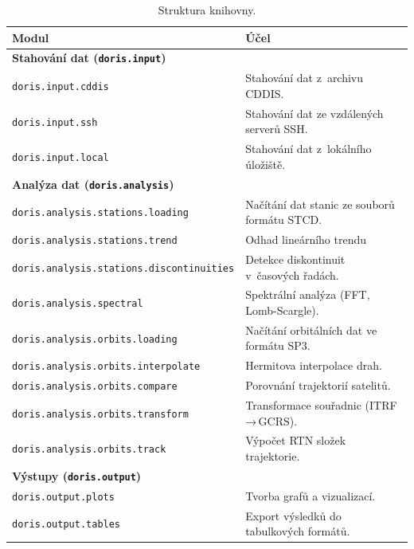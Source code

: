 \begin{table}[H]
\centering
\footnotesize
\setlength{\tabcolsep}{4pt}
\caption{Struktura knihovny.}
\label{tab:doris-structure}

\begin{tabular}{p{} p{}}
\hline
\textbf{Modul} & \textbf{Účel} \\
\hline

\multicolumn{2}{l}{\textbf{Stahování dat (\texttt{doris.input})}} \\
\texttt{doris.input.cddis}                         & Stahování dat z~archivu CDDIS. \\
\texttt{doris.input.ssh}                           & Stahování dat ze vzdálených serverů SSH. \\
\texttt{doris.input.local}                         & Stahování dat z~lokálního úložiště. \\

\hline
\multicolumn{2}{l}{\textbf{Analýza dat (\texttt{doris.analysis})}} \\
\texttt{doris.analysis.stations.loading}           & Načítání dat stanic ze souborů formátu STCD. \\
\texttt{doris.analysis.stations.trend}             & Odhad lineárního trendu \\
\texttt{doris.analysis.stations.discontinuities}   & Detekce diskontinuit v~časových řadách. \\
\texttt{doris.analysis.spectral}                   & Spektrální analýza (FFT, Lomb-Scargle). \\
\texttt{doris.analysis.orbits.loading}             & Načítání orbitálních dat ve formátu SP3. \\
\texttt{doris.analysis.orbits.interpolate}         & Hermitova interpolace drah. \\
\texttt{doris.analysis.orbits.compare}             & Porovnání trajektorií satelitů. \\
\texttt{doris.analysis.orbits.transform}           & Transformace souřadnic (ITRF\,→\,GCRS). \\
\texttt{doris.analysis.orbits.track}               & Výpočet RTN složek trajektorie. \\

\hline
\multicolumn{2}{l}{\textbf{Výstupy (\texttt{doris.output})}} \\
\texttt{doris.output.plots}                        & Tvorba grafů a vizualizací. \\
\texttt{doris.output.tables}                       & Export výsledků do tabulkových formátů. \\

\hline
\end{tabular}
\end{table}

